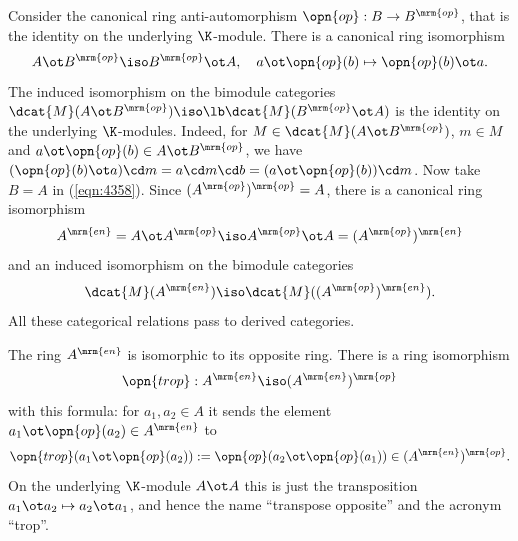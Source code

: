 Consider the canonical ring anti-automorphism 
$\opn{op} : B \to B^{\mrm{op}}$, that is the identity on the underlying 
$\K$-module. There is a canonical ring isomorphism 
\begin{equation} \label{eqn:4358}
A \ot B^{\mrm{op}} \iso B^{\mrm{op}} \ot A ,  \quad  
a \ot \opn{op}(b) \mapsto \opn{op}(b) \ot a .
\end{equation}
The induced isomorphism on the bimodule categories 
$\dcat{M}(A \ot B^{\mrm{op}}) \iso \lb \dcat{M}(B^{\mrm{op}} \ot A)$
is the identity on the underlying $\K$-modules. Indeed, for 
$M \in \dcat{M}(A \ot B^{\mrm{op}})$, $m \in M$ and 
$a \ot \opn{op}(b) \in A \ot B^{\mrm{op}}$, we have 
$(\opn{op}(b) \ot a) \cd m = a \cd m \cd b = (a \ot \opn{op}(b)) \cd m$.
Now take $B = A$ in (\ref{eqn:4358}). Since 
$(A^{\mrm{op}})^{\mrm{op}} = A$, there is a canonical ring isomorphism 
\begin{equation} \label{eqn:4450}
A^{\mrm{en}} = A \ot A^{\mrm{op}} \iso 
A^{\mrm{op}} \ot A = (A^{\mrm{op}})^{\mrm{en}} 
\end{equation}
and an induced isomorphism on the bimodule categories 
\begin{equation} \label{eqn:4355}
\dcat{M}(A^{\mrm{en}}) \iso \dcat{M}((A^{\mrm{op}})^{\mrm{en}}) .
\end{equation}
All these categorical relations pass to derived categories. 

The ring $A^{\mrm{en}}$ is isomorphic to its opposite ring. 
There is a ring isomorphism 
\begin{equation} \label{eqn:4875}
\opn{trop} : A^{\mrm{en}} \iso (A^{\mrm{en}})^{\mrm{op}}
\end{equation}
with this formula: for $a_1, a_2 \in A$ it sends the element 
$a_1 \ot \opn{op}(a_2) \in A^{\mrm{en}}$ to 
\begin{equation} \label{eqn:4876}
\opn{trop}(a_1 \ot \opn{op}(a_2)) := 
\opn{op}(a_2 \ot \opn{op}(a_1)) \in (A^{\mrm{en}})^{\mrm{op}} .
\end{equation}
On the underlying $\K$-module $A \ot A$ this is just the transposition 
$a_1 \ot a_2 \mapsto a_2 \ot a_1$, and hence the name ``transpose opposite'' 
and the acronym ``trop''. 

